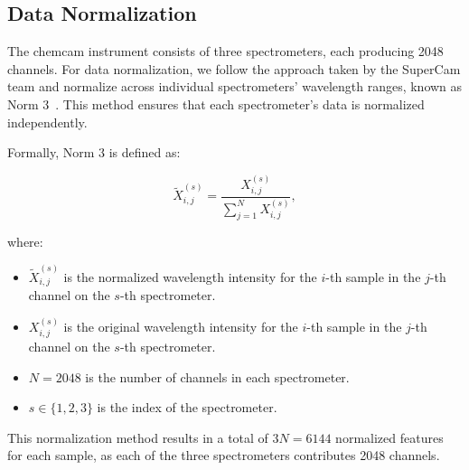 \subsection{Data Normalization}
The \gls{chemcam} instrument consists of three spectrometers, each producing 2048 channels.
For data normalization, we follow the approach taken by the SuperCam team and normalize across individual spectrometers' wavelength ranges, known as Norm 3~\cite{andersonPostlandingMajorElement2022}.
This method ensures that each spectrometer's data is normalized independently.

Formally, Norm 3 is defined as:

\begin{equation}
	\tilde{X}_{i,j}^{(s)} = \frac{X_{i,j}^{(s)}}{\sum_{j=1}^{N} X_{i,j}^{(s)}},
\end{equation}

where:

\begin{itemize}
	\item $\tilde{X}_{i,j}^{(s)}$ is the normalized wavelength intensity for the $i$-th sample in the $j$-th channel on the $s$-th spectrometer.
	\item $X_{i,j}^{(s)}$ is the original wavelength intensity for the $i$-th sample in the $j$-th channel on the $s$-th spectrometer.
	\item $N = 2048$ is the number of channels in each spectrometer.
	\item $s \in \{1, 2, 3\}$ is the index of the spectrometer.
\end{itemize}

This normalization method results in a total of $3N = 6144$ normalized features for each sample, as each of the three spectrometers contributes 2048 channels.
